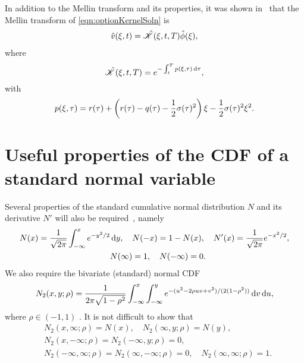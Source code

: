 In addition to the Mellin transform and its properties, it was shown in~\cite{Rodrigo2006} that the Mellin transform of \eqref{eqn:optionKernelSoln} is
\begin{align}
		\label{eqn:mellinVkernel}
		\begin{split}
		\hat v(\xi,t) &= \hat {\mathscr K}(\xi,t,T) \hat \phi(\xi), \\
		\end{split}
	\end{align}
where 
\begin{equation}
	\label{eqn:KhatA}
 \hat{\mathscr K}(\xi,t,T) = e^{-\int_t^T p(\xi,\tau) \,  \mathrm d\tau},
 \end{equation} 
with
	\begin{equation}
		\label{eqn:Khat}
		p(\xi,\tau) = r(\tau) + \left( r(\tau) - q(\tau) - \frac{1}{2}\sigma(\tau)^2 \right)\xi - \frac{1}{2}\sigma(\tau)^2\xi^2.
	\end{equation}

\section{Useful properties of the CDF of a standard normal variable}
\label{subsec:cdfproperties}
Several properties of the standard cumulative normal distribution $N$ and its derivative $N'$ will also be required~\cite[pp. 235--239]{Jeff1995}, namely
	\begin{equation}
		\begin{split}
		N(x) = \fr{1}{\sqrt{2\pi}}\int_{-\infty}^x e^{-y^2/2} & \, \d y, \quad %
		N(-x) = 1 - N(x), \quad
		N'(x) = \fr{1}{\sqrt{2\pi}}e^{-x^2/2} \label{eqn:Nprime}, \\
		&N(\infty) = 1, \quad N(-\infty) = 0.
		\end{split}
	\end{equation}
We also require the bivariate (standard) normal CDF~\cite{Genz2004}
	\begin{equation}
		\label{eqn:N2}
		N_2(x,y;\rho) = \frac{1}{2\pi\sqrt{1-\rho^2}}\int_{-\infty}^x\int_{-\infty}^y e^{-(u^2-2\rho uv + v^2)/(2(1-\rho^2))} \, \mathrm d v \, \mathrm d u,
	\end{equation}
where $\rho \in (-1,1)$ . It is not difficult to show that	
	\begin{equation}
		\label{eqn:Nspecial}
		\begin{split}
		&N_2(x,\infty;\rho) = N(x), \quad N_2(\infty,y;\rho) = N(y),\\
		&N_2(x,-\infty;\rho) = N_2(-\infty,y;\rho) = 0, \\
		&N_2(-\infty,\infty;\rho) = N_2(\infty,-\infty;\rho) = 0, \quad N_2(\infty,\infty;\rho) = 1.
		\end{split}
	\end{equation}
